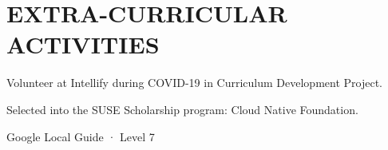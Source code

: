 \documentclass[letterpaper]{deedy-resume} %
\begin{document}
\begin{minipage}[t]{0.66\textwidth}
\sectionspace %


\section{EXTRA-CURRICULAR ACTIVITIES} 
\vspace{\topsep} %
\begin{tightitemize}
\item Volunteer at Intellify during COVID-19 in Curriculum Development Project.
\item Selected into the SUSE Scholarship program: Cloud Native Foundation.
\item Google Local Guide · Level 7
\end{tightitemize}

\sectionspace %


\end{minipage} %








\end{document}
